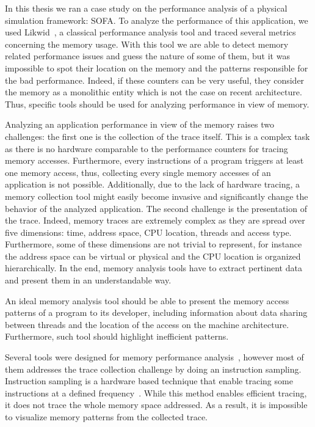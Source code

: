 In this thesis we ran a case study on the performance analysis of a physical simulation framework: \gls{SOFA}.
To analyze the performance of this application, we used \gls{Likwid}~\cite{Treibig10LIKWID}, a classical performance analysis tool and traced several metrics concerning the memory usage.
With this tool we are able to detect memory related performance issues and guess the nature of some of them, but it was impossible to spot their location on the memory and the patterns responsible for the bad performance.
Indeed, if these counters can be very useful, they consider the memory as a monolithic entity which is not the case on recent architecture.
Thus, specific tools should be used for analyzing performance in view of memory.

Analyzing an application performance in view of the memory raises two challenges: the first one is the collection of the trace itself.
This is a complex task as there is no hardware comparable to the performance counters for tracing memory accesses.
Furthermore, every instructions of a program triggers at least one memory access, thus, collecting every single memory accesses of an application is not possible.
Additionally, due to the lack of hardware tracing, a memory collection tool might easily become invasive and significantly change the behavior of the analyzed application.
The second challenge is the presentation of the trace.
Indeed, memory traces are extremely complex as they are spread over five dimensions: time, address space, \gls{CPU} location, threads and access type.
Furthermore, some of these dimensions are not trivial to represent, for instance the address space can be virtual or physical and the \gls{CPU} location is organized hierarchically.
In the end, memory analysis tools have to extract pertinent data and present them in an understandable way.

An ideal memory analysis tool should be able to present the memory access patterns of a program to its developer, including information about data sharing between threads and the location of the access on the machine architecture.
Furthermore, such tool should highlight inefficient patterns.

Several tools were designed for memory performance analysis~\cite{Lachaize12MemProf,Liu14Tool,Gimenez14Dissecting}, however most of them addresses the trace collection challenge by doing an instruction sampling.
Instruction sampling is a hardware based technique that enable tracing some instructions at a defined frequency~\cite{Drongowski07Instructionbased,Levinthal09Performance}.
While this method enables efficient tracing, it does not trace the whole memory space addressed.
As a result, it is impossible to visualize memory patterns from the collected trace.


